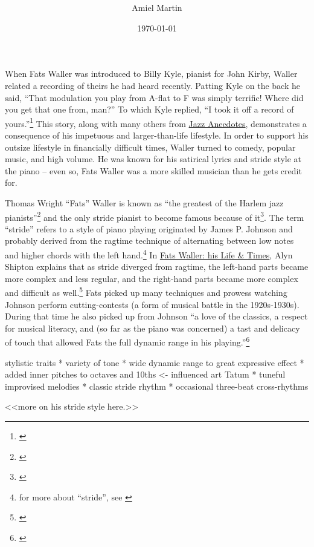 \documentclass[11pt]{report}
\title{\fattitle \\
	\large \fatslogan}
\author{Amiel Martin}
\date{\today}
\begin{document}
	\maketitle

	\label{sec:introduction}
	When Fats Waller was introduced to Billy Kyle, pianist for John Kirby, Waller related a recording of theirs he had heard recently. Patting Kyle on the back he said, ``That modulation you play from A-flat to F was simply terrific! Where did you get that one from, man?'' To which Kyle replied, ``I took it off a record of yours.''\footnote{\cite[231]{anecdotes}} This story, along with many others from \underline{Jazz Anecdotes}, demonstrates a consequence of his impetuous and larger-than-life lifestyle. In order to support his outsize lifestyle in financially difficult times, Waller turned to comedy, popular music, and high volume. He was known for his satirical lyrics and stride style at the piano -- even so, Fats Waller was a more skilled musician than he gets credit for.

	\label{sec:piano_skills}
	Thomas Wright ``Fats'' Waller is known as ``the greatest of the Harlem jazz pianists''\footnote{\cite[2]{life}} and the only stride pianist to become famous because of it\footnote{\cite[146]{visions}}. The term ``stride'' refers to a style of piano playing originated by James P. Johnson and probably derived from the ragtime technique of alternating between low notes and higher chords with the left hand.\footnote{for more about ``stride'', see \cite[79]{experience}} In \underline{Fats Waller: his Life \& Times}, Alyn Shipton explains that as stride diverged from ragtime, the left-hand parts became more complex and less regular, and the right-hand parts became more complex and difficult as well.\footnote{\cite[5]{life}} Fats picked up many techniques and prowess watching Johnson perform cutting-contests (a form of musical battle in the 1920s-1930s). During that time he also picked up from Johnson ``a love of the classics, a respect for musical literacy, and (so far as the piano was concerned) a tast and delicacy of touch that allowed Fats the full dynamic range in his playing.''\footnote{\cite[8]{life}}
	
	stylistic traits
	* variety of tone
	* wide dynamic range to great expressive effect
	* added inner pitches to octaves and 10ths <- influenced art Tatum
	* tuneful improvised melodies
	* classic stride rhythm
	* occasional three-beat cross-rhythms
	
	<<more on his stride style here.>>
	
\end{document}
